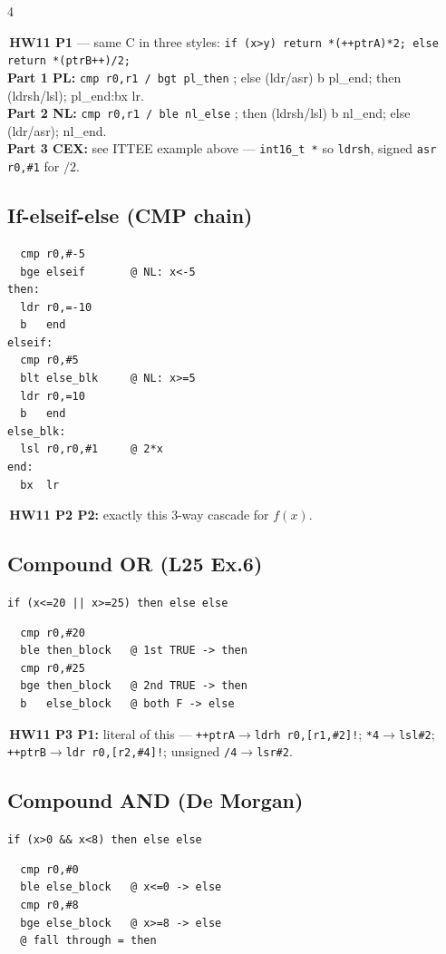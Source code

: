 \documentclass[8pt,landscape]{extarticle}
\newcommand{\asm}[1]{\texttt{\scriptsize #1}}
\newcommand{\cee}[1]{\texttt{\scriptsize #1}}
\newenvironment{ex}
  {\par\smallskip\noindent{\scriptsize\color{red!55!black}\textbf{Ex.}}\,\scriptsize\ignorespaces}
  {\par}
\begin{document}
\begin{multicols*}{4}
\begin{ex}\textbf{HW11 P1} --- same C in three styles:
\cee{if (x>y) return *(++ptrA)*2; else return *(ptrB++)/2;}\\
\textbf{Part 1 PL:} \asm{cmp r0,r1 / bgt pl\_then} ; else (ldr/asr) b pl\_end; then (ldrsh/lsl); pl\_end:bx lr.\\
\textbf{Part 2 NL:} \asm{cmp r0,r1 / ble nl\_else} ; then (ldrsh/lsl) b nl\_end; else (ldr/asr); nl\_end.\\
\textbf{Part 3 CEX:} see ITTEE example above --- \cee{int16\_t *} so \asm{ldrsh}, signed \asm{asr r0,\#1} for $/2$.\end{ex}

\subsection{If-elseif-else (CMP chain)}
\begin{lstlisting}
  cmp r0,#-5
  bge elseif       @ NL: x<-5
then:
  ldr r0,=-10
  b   end
elseif:
  cmp r0,#5
  blt else_blk     @ NL: x>=5
  ldr r0,=10
  b   end
else_blk:
  lsl r0,r0,#1     @ 2*x
end:
  bx  lr
\end{lstlisting}
\begin{ex}\textbf{HW11 P2 P2:} exactly this 3-way cascade for $f(x)$.\end{ex}

\subsection{Compound OR (L25 Ex.6)}
\cee{if (x<=20 || x>=25) then else else}
\begin{lstlisting}
  cmp r0,#20
  ble then_block   @ 1st TRUE -> then
  cmp r0,#25
  bge then_block   @ 2nd TRUE -> then
  b   else_block   @ both F -> else
\end{lstlisting}
\begin{ex}\textbf{HW11 P3 P1:} literal of this --- \cee{*++ptrA}$\to$\asm{ldrh r0,[r1,\#2]!}; \texttt{*4}$\to$\asm{lsl\#2}; \cee{*++ptrB}$\to$\asm{ldr r0,[r2,\#4]!}; unsigned \texttt{/4}$\to$\asm{lsr\#2}.\end{ex}

\subsection{Compound AND (De Morgan)}
\cee{if (x>0 \&\& x<8) then else else}
\begin{lstlisting}
  cmp r0,#0
  ble else_block   @ x<=0 -> else
  cmp r0,#8
  bge else_block   @ x>=8 -> else
  @ fall through = then
\end{lstlisting}


\end{multicols*}
\end{document}
